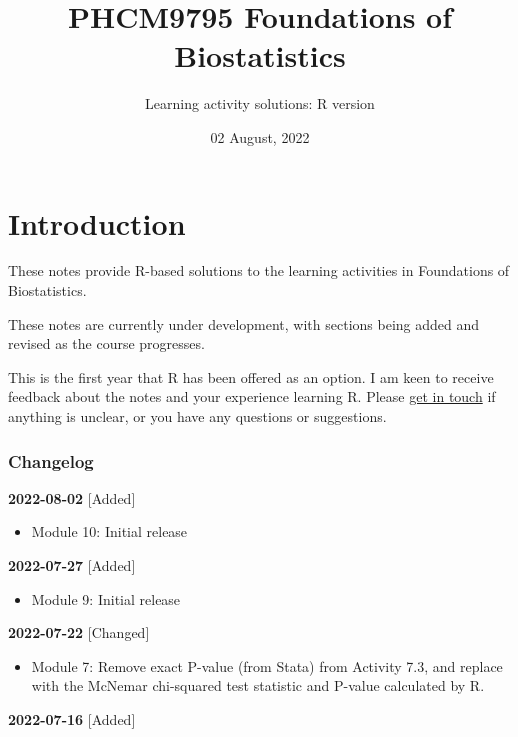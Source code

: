 \documentclass[
]{memoir}
\title{PHCM9795 Foundations of Biostatistics}
\author{Learning activity solutions: R version}
\date{02 August, 2022}
\providecommand{\tightlist}{%
  \setlength{\itemsep}{0pt}\setlength{\parskip}{0pt}}
\begin{document}
\maketitle

{
\setcounter{tocdepth}{1}
\tableofcontents
}
\hypertarget{introduction}{%
\chapter*{Introduction}\label{introduction}}

These notes provide R-based solutions to the learning activities in Foundations of Biostatistics.

These notes are currently under development, with sections being added and revised as the course progresses.

This is the first year that R has been offered as an option. I am keen to receive feedback about the notes and your experience learning R. Please \href{mailto:t.dobbins@unsw.edu.au}{get in touch} if anything is unclear, or you have any questions or suggestions.

\hypertarget{changelog}{%
\subsection*{Changelog}\label{changelog}}

\textbf{2022-08-02}
{[}Added{]}

\begin{itemize}
\tightlist
\item
  Module 10: Initial release
\end{itemize}

\textbf{2022-07-27}
{[}Added{]}

\begin{itemize}
\tightlist
\item
  Module 9: Initial release
\end{itemize}

\textbf{2022-07-22}
{[}Changed{]}

\begin{itemize}
\tightlist
\item
  Module 7: Remove exact P-value (from Stata) from Activity 7.3, and replace with the McNemar chi-squared test statistic and P-value calculated by R.
\end{itemize}

\textbf{2022-07-16}
{[}Added{]}
\end{document}
